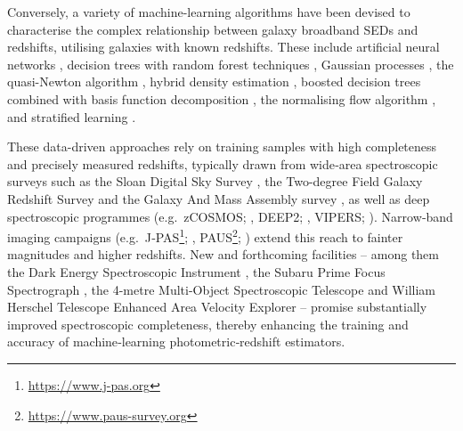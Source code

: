 Conversely, a variety of machine-learning algorithms have been devised to characterise the complex relationship between galaxy broadband SEDs and redshifts, utilising galaxies with known redshifts. These include artificial neural networks \citep[\texttt{ANNz};][]{2004PASP..116..345C, 2016PASP..128j4502S}, decision trees with random forest techniques \citep[\texttt{TPZ};][]{2013MNRAS.432.1483C}, Gaussian processes \citep[\texttt{GPz};][]{2016MNRAS.462..726A}, the quasi-Newton algorithm \citep[\texttt{MLPQNA};][]{2012A&A...546A..13C}, hybrid density estimation \citep[\texttt{METAPHOR};][]{2017MNRAS.465.1959C}, boosted decision trees combined with basis function decomposition \citep[\texttt{FlexZBoost};][]{10.1214/17-EJS1302, 2020A&C....3000362D, 2020MNRAS.499.1587S}, the normalising flow algorithm \citep[\texttt{PZFlow}; ][]{2024AJ....168...80C}, and stratified learning \citep[\texttt{StratLearn-z};][]{2018MNRAS.473.3969R, 2024MNRAS.534.3808A, 2025OJAp....8E..50M}. 

These data-driven approaches rely on training samples with high completeness and precisely measured redshifts, typically drawn from wide‐area spectroscopic surveys such as the Sloan Digital Sky Survey \cite[SDSS\footnote{\url{https://www.sdss.org}};][]{2000AJ....120.1579Y}, the Two-degree Field Galaxy Redshift Survey \citep[2DFGRS\footnote{\url{http://www.2dfgrs.net}};][]{2001MNRAS.328.1039C} and the Galaxy And Mass Assembly survey \citep[GAMA\footnote{\url{https://www.gama-survey.org}};][]{2011MNRAS.413..971D}, as well as deep spectroscopic programmes (e.g.\ zCOSMOS; \citealp{2007ApJS..172...70L}, DEEP2; \citealp{2013ApJS..208....5N}, VIPERS; \citealp{2014A&A...566A.108G}). Narrow‐band imaging campaigns (e.g.\ J‐PAS\footnote{\url{https://www.j-pas.org}}; \citealp{2014arXiv1403.5237B}, PAUS\footnote{\url{https://www.paus-survey.org}}; \citealp{2025A&A...693A.102D}) extend this reach to fainter magnitudes and higher redshifts. New and forthcoming facilities -- among them the Dark Energy Spectroscopic Instrument \citep[DESI\footnote{\url{https://www.desi.lbl.gov}};][]{2024AJ....167...62D}, the Subaru Prime Focus Spectrograph \citep[PFS\footnote{\url{https://pfs.ipmu.jp}};][]{2014PASJ...66R...1T}, the 4-metre Multi-Object Spectroscopic Telescope \citep[4MOST\footnote{\url{https://www.4most.eu/cms/home/}};][]{2016SPIE.9910E..1NW} and William Herschel Telescope Enhanced Area Velocity Explorer \citep[WEAVE\footnote{\url{https://www.ing.iac.es/astronomy/instruments/weave/weaveinst.html}};][]{2024MNRAS.530.2688J} -- promise substantially improved spectroscopic completeness, thereby enhancing the training and accuracy of machine‐learning photometric‐redshift estimators.

